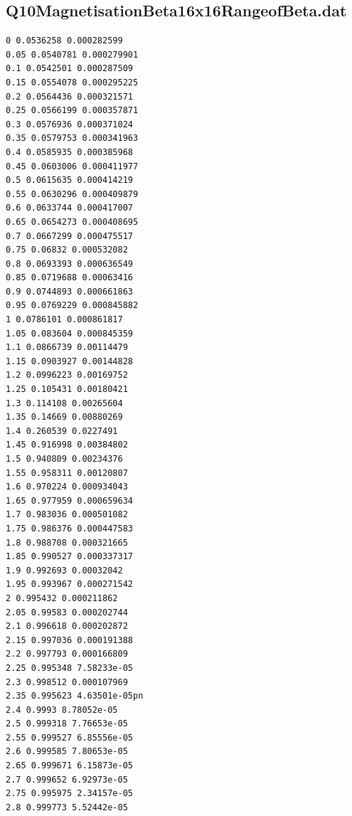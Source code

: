 \subsection{Q10MagnetisationBeta16x16RangeofBeta.dat}
\begin{lstlisting}
0 0.0536258 0.000282599
0.05 0.0540781 0.000279901
0.1 0.0542501 0.000287509
0.15 0.0554078 0.000295225
0.2 0.0564436 0.000321571
0.25 0.0566199 0.000357871
0.3 0.0576936 0.000371024
0.35 0.0579753 0.000341963
0.4 0.0585935 0.000385968
0.45 0.0603006 0.000411977
0.5 0.0615635 0.000414219
0.55 0.0630296 0.000409879
0.6 0.0633744 0.000417007
0.65 0.0654273 0.000408695
0.7 0.0667299 0.000475517
0.75 0.06832 0.000532082
0.8 0.0693393 0.000636549
0.85 0.0719688 0.00063416
0.9 0.0744893 0.000661863
0.95 0.0769229 0.000845882
1 0.0786101 0.000861817
1.05 0.083604 0.000845359
1.1 0.0866739 0.00114479
1.15 0.0903927 0.00144828
1.2 0.0996223 0.00169752
1.25 0.105431 0.00180421
1.3 0.114108 0.00265604
1.35 0.14669 0.00880269
1.4 0.260539 0.0227491
1.45 0.916998 0.00384802
1.5 0.940809 0.00234376
1.55 0.958311 0.00120807
1.6 0.970224 0.000934043
1.65 0.977959 0.000659634
1.7 0.983036 0.000501082
1.75 0.986376 0.000447583
1.8 0.988708 0.000321665
1.85 0.990527 0.000337317
1.9 0.992693 0.00032042
1.95 0.993967 0.000271542
2 0.995432 0.000211862
2.05 0.99583 0.000202744
2.1 0.996618 0.000202872
2.15 0.997036 0.000191388
2.2 0.997793 0.000166809
2.25 0.995348 7.58233e-05
2.3 0.998512 0.000107969
2.35 0.995623 4.63501e-05pn
2.4 0.9993 8.78052e-05
2.5 0.999318 7.76653e-05
2.55 0.999527 6.85556e-05
2.6 0.999585 7.80653e-05
2.65 0.999671 6.15873e-05
2.7 0.999652 6.92973e-05
2.75 0.995975 2.34157e-05
2.8 0.999773 5.52442e-05
\end{lstlisting}

